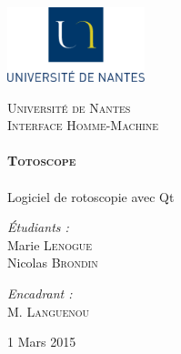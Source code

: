 \begin{titlepage}
 
	 \includegraphics[width=4cm]{figures/UN.png}~\\[1cm]
	\begin{center}
    \textsc{\LARGE Université de Nantes}\\[2cm]

    \textsc{\Large Interface Homme-Machine}\\[2cm]

    \HRule \\[0.4cm]
    { \huge \bfseries \textsc{Totoscope}\\[0.4cm] }
    \HRule \\[2cm]
    
    {\LARGE Logiciel de rotoscopie avec Qt} 
	\\[6cm]

    \begin{minipage}{0.4\textwidth}
      \begin{flushleft} \large
        \emph{\'Etudiants :}\\
        Marie \textsc{Lenogue}\\
        Nicolas \textsc{Brondin}
      \end{flushleft}
    \end{minipage}
    \begin{minipage}{0.4\textwidth}
      \begin{flushright} \large
        \emph{Encadrant :}\\
         M. \textsc{Languenou}\\
      \end{flushright}
    \end{minipage}

    \vfill

    {\large 1\ier{} Mars 2015}

  \end{center}
\end{titlepage}

